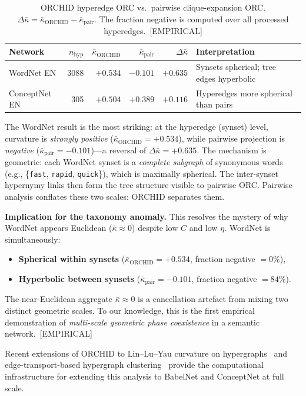 \documentclass[11pt,a4paper]{article}
\newcommand{\kbar}{\bar{\kappa}}
\begin{document}
\begin{table}[h]
\centering
\small
\caption{ORCHID hyperedge ORC vs.\ pairwise clique-expansion ORC. $\Delta\kbar = \kbar_{\text{ORCHID}} - \kbar_{\text{pair}}$. The fraction negative is computed over all processed hyperedges.~[EMPIRICAL]}
\label{tab:orchid_results}
\begin{tabular}{@{}lrrrrl@{}}
\toprule
Network & $n_{\text{hyp}}$ & $\kbar_{\text{ORCHID}}$ & $\kbar_{\text{pair}}$ & $\Delta\kbar$ & Interpretation \\
\midrule
WordNet EN    & 3088 & $+0.534$ & $-0.101$ & $\mathbf{+0.635}$ & Synsets spherical; tree edges hyperbolic \\
ConceptNet EN &  305 & $+0.504$ & $+0.389$ & $+0.116$          & Hyperedges more spherical than pairs \\
\bottomrule
\end{tabular}
\end{table}

The WordNet result is the most striking: at the hyperedge (synset) level, curvature is \emph{strongly positive} ($\kbar_{\text{ORCHID}}=+0.534$), while pairwise projection is \emph{negative} ($\kbar_{\text{pair}}=-0.101$)---a reversal of $\Delta\kbar = +0.635$. The mechanism is geometric: each WordNet synset is a \emph{complete subgraph} of synonymous words (e.g., \{\texttt{fast}, \texttt{rapid}, \texttt{quick}\}), which is maximally spherical. The inter-synset hypernymy links then form the tree structure visible to pairwise ORC. Pairwise analysis conflates these two scales: ORCHID separates them.

\textbf{Implication for the taxonomy anomaly.} This resolves the mystery of why WordNet appears Euclidean ($\kbar \approx 0$) despite low $C$ and low $\eta$. WordNet is simultaneously:
\begin{itemize}
  \item \textbf{Spherical within synsets} ($\kbar_{\text{ORCHID}} = +0.534$, fraction negative $= 0\%$),
  \item \textbf{Hyperbolic between synsets} ($\kbar_{\text{pair}} = -0.101$, fraction negative $= 84\%$).
\end{itemize}
The near-Euclidean aggregate $\kbar \approx 0$ is a cancellation artefact from mixing two distinct geometric scales. To our knowledge, this is the first empirical demonstration of \emph{multi-scale geometric phase coexistence} in a semantic network.~[EMPIRICAL]

Recent extensions of ORCHID to Lin--Lu--Yau curvature on hypergraphs~\cite{lly2025hypergraph} and edge-transport-based hypergraph clustering~\cite{coupette2025hypergraph} provide the computational infrastructure for extending this analysis to BabelNet and ConceptNet at full scale.
\end{document}
